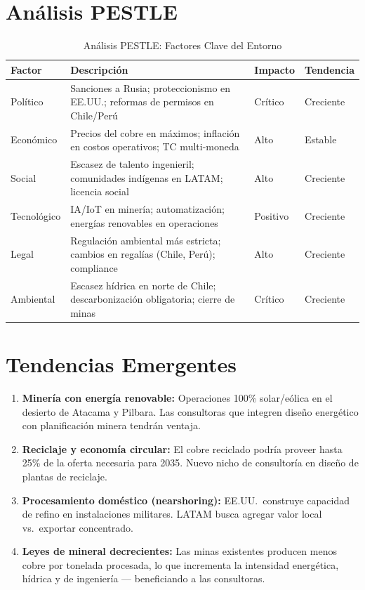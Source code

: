 \section{Análisis PESTLE}

\begin{table}[htbp]
\centering
\caption{Análisis PESTLE: Factores Clave del Entorno}
\begin{tabular}{@{}p{2cm}p{5.5cm}p{2cm}p{2.5cm}@{}}
\toprule
\textbf{Factor} & \textbf{Descripción} & \textbf{Impacto} & \textbf{Tendencia} \\
\midrule
Político & Sanciones a Rusia; proteccionismo en EE.UU.; reformas de permisos en Chile/Perú & Crítico & \trendup{} Creciente \\
\rowcolor{tablealt} Económico & Precios del cobre en máximos; inflación en costos operativos; TC multi-moneda & Alto & \trendflat{} Estable \\
Social & Escasez de talento ingenieril; comunidades indígenas en LATAM; licencia social & Alto & \trendup{} Creciente \\
\rowcolor{tablealt} Tecnológico & IA/IoT en minería; automatización; energías renovables en operaciones & Positivo & \trendup{} Creciente \\
Legal & Regulación ambiental más estricta; cambios en regalías (Chile, Perú); compliance & Alto & \trendup{} Creciente \\
\rowcolor{tablealt} Ambiental & Escasez hídrica en norte de Chile; descarbonización obligatoria; cierre de minas & Crítico & \trendup{} Creciente \\
\bottomrule
\end{tabular}
\label{tab:pestle}
\end{table}

\section{Tendencias Emergentes}

\begin{enumerate}
    \item \textbf{Minería con energía renovable:} Operaciones 100\% solar/eólica en el desierto de Atacama y Pilbara. Las consultoras que integren diseño energético con planificación minera tendrán ventaja.
    \item \textbf{Reciclaje y economía circular:} El cobre reciclado podría proveer hasta 25\% de la oferta necesaria para 2035. Nuevo nicho de consultoría en diseño de plantas de reciclaje.
    \item \textbf{Procesamiento doméstico (nearshoring):} EE.UU.\ construye capacidad de refino en instalaciones militares. LATAM busca agregar valor local vs.\ exportar concentrado.
    \item \textbf{Leyes de mineral decrecientes:} Las minas existentes producen menos cobre por tonelada procesada, lo que incrementa la intensidad energética, hídrica y de ingeniería — beneficiando a las consultoras.
\end{enumerate}
